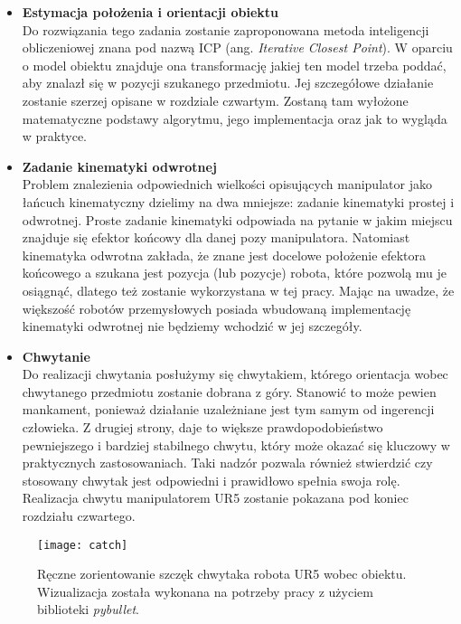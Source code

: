 \documentclass{article}
\begin{document}
\begin{itemize}
\item \textbf{Estymacja położenia i orientacji obiektu} \\
Do rozwiązania tego zadania zostanie zaproponowana metoda inteligencji obliczeniowej znana pod nazwą ICP (ang. \emph{Iterative Closest Point}). W oparciu o model obiektu znajduje ona transformację jakiej ten model trzeba poddać, aby znalazł się w pozycji szukanego przedmiotu. Jej szczegółowe działanie zostanie szerzej opisane w rozdziale czwartym. Zostaną tam wyłożone matematyczne podstawy algorytmu, jego implementacja oraz jak to wygląda w praktyce.

\item \textbf{Zadanie kinematyki odwrotnej} \\
Problem znalezienia odpowiednich wielkości opisujących manipulator jako łańcuch kinematyczny dzielimy na dwa mniejsze: zadanie kinematyki prostej i odwrotnej. Proste zadanie kinematyki odpowiada na pytanie w jakim miejscu znajduje się efektor końcowy dla danej pozy manipulatora. Natomiast kinematyka odwrotna zakłada, że znane jest docelowe położenie efektora końcowego a szukana jest pozycja (lub pozycje) robota, które pozwolą mu je osiągnąć, dlatego też zostanie wykorzystana w tej pracy. Mając na uwadze, że większość robotów przemysłowych posiada wbudowaną implementację kinematyki odwrotnej nie będziemy wchodzić w jej szczegóły.

\item \textbf{Chwytanie} \\
Do realizacji chwytania posłużymy się chwytakiem, którego orientacja wobec chwytanego przedmiotu zostanie dobrana z góry. Stanowić to może pewien mankament, ponieważ działanie uzależniane jest tym samym od ingerencji człowieka. Z drugiej strony, daje to większe prawdopodobieństwo pewniejszego i bardziej stabilnego chwytu, który może okazać się kluczowy w praktycznych zastosowaniach. Taki nadzór pozwala również stwierdzić czy stosowany chwytak jest odpowiedni i prawidłowo spełnia swoja rolę. Realizacja chwytu manipulatorem UR5 zostanie pokazana pod koniec rozdziału czwartego.
\end{itemize}

\begin{figure}[h]
\centering
\texttt{[image: catch]}
\caption{Ręczne zorientowanie szczęk chwytaka robota UR5 wobec obiektu. Wizualizacja została wykonana na potrzeby pracy z użyciem biblioteki \emph{pybullet}.}
\end{figure}
\end{document}
